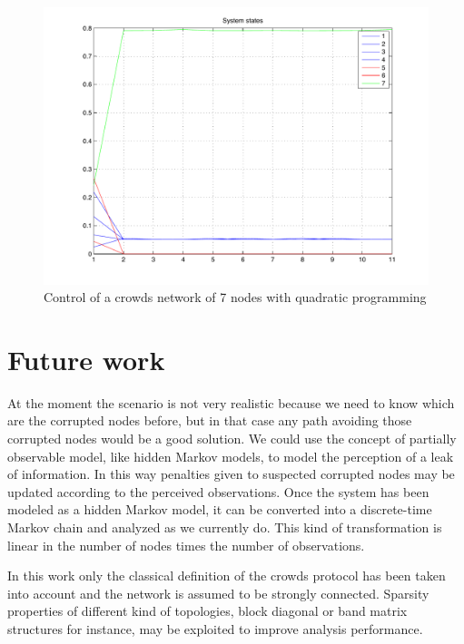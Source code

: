\documentclass[a4paper, 11pt]{article}
\theoremstyle{definition}
\theoremstyle{remark}
\begin{document}
\begin{figure}[htbp]
	\begin{center}
	\includegraphics[width=.8\textwidth]{images/qp}
	\end{center}
	\caption{Control of a crowds network of 7 nodes with quadratic programming}
	\label{fig:results2}
\end{figure}




\section{Future work} %
\label{sec:future_work}

At the moment the scenario is not very realistic because we need to know which are the corrupted nodes before, but in that case any path avoiding those corrupted nodes would be a good solution. We could use the concept of partially observable model, like hidden Markov models, to model the perception of a leak of information. In this way penalties given to suspected corrupted nodes may be updated according to the perceived observations. Once the system has been modeled as a hidden Markov model, it can be converted into a discrete-time Markov chain and analyzed as we currently do. This kind of transformation is linear in the number of nodes times the number of observations.

In this work only the classical definition of the crowds protocol has been taken into account and the network is assumed to be strongly connected. Sparsity properties of different kind of topologies, block diagonal or band matrix structures for instance, may be exploited to improve analysis performance.



\end{document}

